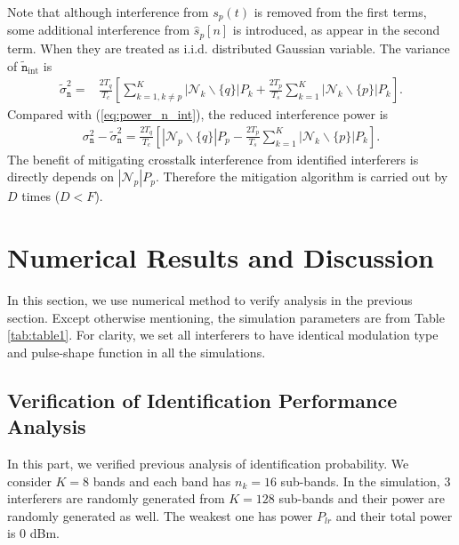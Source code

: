 \documentclass{IEEEtran}
\begin{document}
Note that although interference from $s_p(t)$ is removed from the first terms, some additional interference from $\hat{s}_p[n]$ is introduced, as appear in the second term. When they are treated as i.i.d. distributed Gaussian variable. The variance of $\tilde{\mathtt{n}}_{\text{int}}$ is 
\begin{align}
\tilde{\sigma}^2_{\mathtt{n}} = &\frac{2T_q}{T_c}\left[\sum\limits_{k=1,k\neq p}^{K}\left|\mathcal{N}_k\backslash \{q\}\right|P_k+\frac{2T_p}{T_s}\sum\limits_{k=1}^{K}\left|\mathcal{N}_k\backslash \{p\}\right|P_k\right].
\end{align}
Compared with (\ref{eq:power_n_int}), the reduced interference power is
\begin{align}
\sigma^2_{\mathtt{n}}-\tilde{\sigma}^2_{\mathtt{n}} = \frac{2T_q}{T_c}\left[\left|\mathcal{N}_p\backslash \{q\}\right|P_p-\frac{2T_p}{T_s}\sum\limits_{k=1}^{K}\left|\mathcal{N}_k\backslash \{p\}\right|P_k\right].
\end{align}
The benefit of mitigating crosstalk interference from identified interferers is directly depends on $|\mathcal{N}_p|P_p$. Therefore the mitigation algorithm is carried out by $D$ times ($D<F$).

%
%
\section{Numerical Results and Discussion}
\label{sec:Results}
In this section, we use numerical method to verify analysis in the previous section. Except otherwise mentioning, the simulation parameters are from Table \ref{tab:table1}. For clarity, we set all interferers to have identical modulation type and pulse-shape function in all the simulations. 
%
%
\subsection{Verification of Identification Performance Analysis}
In this part, we verified previous analysis of identification probability. We consider $K = 8$ bands and each band has $n_k = 16$ sub-bands. In the simulation, 3 interferers are randomly generated from $K = 128$ sub-bands and their power are randomly generated as well. The weakest one has power $P_{lr}$ and their total power is 0 dBm. 
\end{document}
